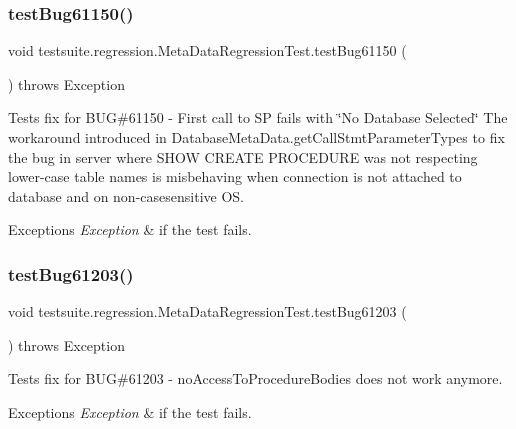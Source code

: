 \subsubsection{\texorpdfstring{test\+Bug61150()}{testBug61150()}}
{\footnotesize\ttfamily void testsuite.\+regression.\+Meta\+Data\+Regression\+Test.\+test\+Bug61150 (\begin{DoxyParamCaption}{ }\end{DoxyParamCaption}) throws Exception}

Tests fix for B\+UG\#61150 -\/ First call to SP fails with \char`\"{}\+No Database Selected\char`\"{} The workaround introduced in Database\+Meta\+Data.\+get\+Call\+Stmt\+Parameter\+Types to fix the bug in server where S\+H\+OW C\+R\+E\+A\+TE P\+R\+O\+C\+E\+D\+U\+RE was not respecting lower-\/case table names is misbehaving when connection is not attached to database and on non-\/casesensitive OS.


\begin{DoxyExceptions}{Exceptions}
{\em Exception} & if the test fails. \\
\hline
\end{DoxyExceptions}
\mbox{\label{classtestsuite_1_1regression_1_1_meta_data_regression_test_a0dd9e6de4ad836964f235a4a27aed144}} 
\subsubsection{\texorpdfstring{test\+Bug61203()}{testBug61203()}}
{\footnotesize\ttfamily void testsuite.\+regression.\+Meta\+Data\+Regression\+Test.\+test\+Bug61203 (\begin{DoxyParamCaption}{ }\end{DoxyParamCaption}) throws Exception}

Tests fix for B\+UG\#61203 -\/ no\+Access\+To\+Procedure\+Bodies does not work anymore.


\begin{DoxyExceptions}{Exceptions}
{\em Exception} & if the test fails. \\
\hline
\end{DoxyExceptions}
\mbox{\label{classtestsuite_1_1regression_1_1_meta_data_regression_test_aaf434af6a2a4b3cc948e8973837c8cca}} 
